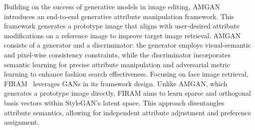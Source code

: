 Building on the success of generative models in image editing, AMGAN~\cite{amgan} introduces an end-to-end generative attribute manipulation framework. This framework generates a prototype image that aligns with user-desired attribute modifications on a reference image to improve target image retrieval. AMGAN consists of a generator and a discriminator: the generator employs visual-semantic and pixel-wise consistency constraints, while the discriminator incorporates semantic learning for precise attribute manipulation and adversarial metric learning to enhance fashion search effectiveness.
Focusing on face image retrieval, FIRAM~\cite{firam} leverages GANs in its framework design. Unlike AMGAN, which generates a prototype image directly, FIRAM aims to learn sparse and orthogonal basis vectors within StyleGAN's latent space. This approach disentangles attribute semantics, allowing for independent attribute adjustment and preference assignment.


